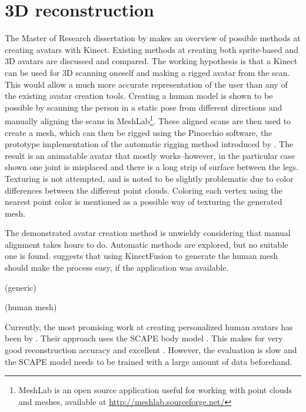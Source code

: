 \section{3D reconstruction}

The Master of Research dissertation by \citet{charpentier2011accurate} makes an overview of possible methods at creating avatars with Kinect. Existing methods at creating both sprite-based and 3D avatars are discussed and compared. The working hypothesis is that a Kinect can be used for 3D scanning oneself and making a rigged avatar from the scan. This would allow a much more accurate representation of the user than any of the existing avatar creation tools. Creating a human model is shown to be possible by scanning the person in a static pose from different directions and manually aligning the scans in MeshLab\footnote{MeshLab is an open source application useful for working with point clouds and meshes, available at \url{http://meshlab.sourceforge.net/}}. These aligned scans are then used to create a mesh, which can then be rigged using the Pinocchio software, the prototype implementation of the automatic rigging method introduced by \citep{baran2007automatic}. The result is an animatable avatar that mostly works--however, in the particular case shown one joint is misplaced and there is a long strip of surface between the legs. Texturing is not attempted, and is noted to be slightly problematic due to color differences between the different point clouds. Coloring each vertex using the nearest point color is mentioned as a possible way of texturing the generated mesh. \citep{charpentier2011accurate}

The demonstrated avatar creation method is unwieldy considering that manual alignment takes hours to do. Automatic methods are explored, but no suitable one is found.  suggests that using KinectFusion to generate the human mesh should make the process easy, if the application was available. \citep{charpentier2011accurate}



(generic)
\citep{fabio2003point}

(human mesh)

Currently, the most promising work at creating personalized human avatars has been by \citet{weiss2011home}. Their approach uses the SCAPE body model \citep{anguelov2005scape}. This makes for very good reconstruction accuracy and excellent . However, the evaluation is slow and the SCAPE model needs to be trained with a large amount of data beforehand.

